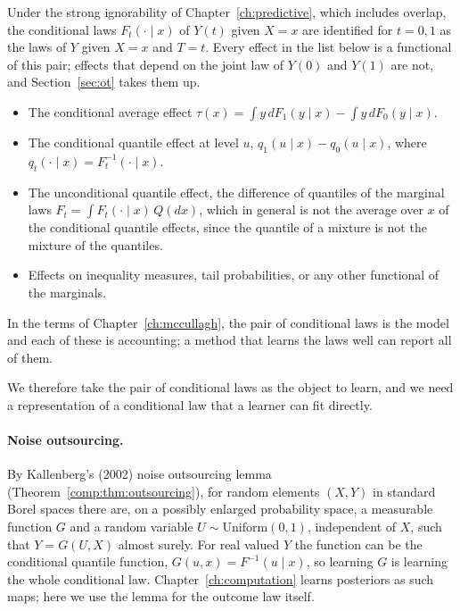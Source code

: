 Under the strong ignorability of Chapter~\ref{ch:predictive}, which includes overlap, the conditional laws $F_t(\cdot \mid x)$ of $Y(t)$ given $X = x$ are identified for $t = 0, 1$ as the laws of $Y$ given $X = x$ and $T = t$. Every effect in the list below is a functional of this pair; effects that depend on the joint law of $Y(0)$ and $Y(1)$ are not, and Section~\ref{sec:ot} takes them up.
\begin{itemize}
\item The conditional average effect $\tau(x) = \int y\,dF_1(y \mid x) - \int y\,dF_0(y \mid x)$.
\item The conditional quantile effect at level $u$, $q_1(u \mid x) - q_0(u \mid x)$, where $q_t(\cdot \mid x) = F_t^{-1}(\cdot \mid x)$.
\item The unconditional quantile effect, the difference of quantiles of the marginal laws $F_t = \int F_t(\cdot \mid x)\,Q(dx)$, which in general is not the average over $x$ of the conditional quantile effects, since the quantile of a mixture is not the mixture of the quantiles.
\item Effects on inequality measures, tail probabilities, or any other functional of the marginals.
\end{itemize}
In the terms of Chapter~\ref{ch:mccullagh}, the pair of conditional laws is the model and each of these is accounting; a method that learns the laws well can report all of them.

We therefore take the pair of conditional laws as the object to learn, and we need a representation of a conditional law that a learner can fit directly.

\paragraph{Noise outsourcing.} By Kallenberg's (2002) noise outsourcing lemma (Theorem~\ref{comp:thm:outsourcing}), for random elements $(X, Y)$ in standard Borel spaces there are, on a possibly enlarged probability space, a measurable function $G$ and a random variable $U \sim \mathrm{Uniform}(0,1)$, independent of $X$, such that $Y = G(U, X)$ almost surely. For real valued $Y$ the function can be the conditional quantile function, $G(u, x) = F^{-1}(u \mid x)$, so learning $G$ is learning the whole conditional law. Chapter~\ref{ch:computation} learns posteriors as such maps; here we use the lemma for the outcome law itself.

